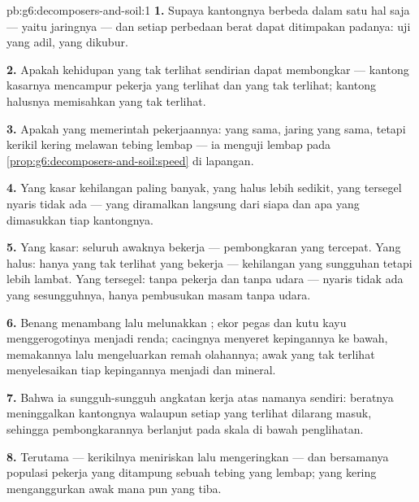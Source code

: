 \begin{solution}{pb:g6:decomposers-and-soil:1}
\textbf{1.} Supaya kantongnya berbeda dalam satu hal saja --- yaitu
jaringnya --- dan setiap perbedaan berat dapat ditimpakan padanya: uji
yang adil, yang dikubur.

\textbf{2.} Apakah kehidupan  yang tak terlihat sendirian dapat
membongkar  --- kantong kasarnya mencampur pekerja yang terlihat
dan yang tak terlihat; kantong halusnya memisahkan yang tak terlihat.

\textbf{3.} Apakah  yang memerintah pekerjaannya:  yang
sama, jaring yang sama, tetapi kerikil kering melawan tebing lembap
--- ia menguji  lembap pada
\cref{prop:g6:decomposers-and-soil:speed} di lapangan.

\textbf{4.} Yang kasar kehilangan paling banyak, yang halus lebih
sedikit, yang tersegel nyaris tidak ada --- yang diramalkan langsung
dari siapa dan apa yang dimasukkan tiap kantongnya.

\textbf{5.} Yang kasar: seluruh awaknya bekerja --- pembongkaran yang
tercepat. Yang halus: hanya yang tak terlihat yang bekerja ---
kehilangan yang sungguhan tetapi lebih lambat. Yang tersegel: tanpa
pekerja dan tanpa udara --- nyaris tidak ada  yang
sesungguhnya, hanya pembusukan masam tanpa udara.

\textbf{6.} Benang  menambang lalu melunakkan ; ekor
pegas dan kutu kayu menggerogotinya menjadi renda; cacingnya menyeret
kepingannya ke bawah, memakannya lalu mengeluarkan remah olahannya;
awak yang tak terlihat menyelesaikan tiap kepingannya menjadi 
dan mineral.

\textbf{7.} Bahwa ia sungguh-sungguh angkatan kerja  atas
namanya sendiri: beratnya meninggalkan kantongnya walaupun setiap
 yang terlihat dilarang masuk, sehingga pembongkarannya berlanjut
pada skala di bawah penglihatan.

\textbf{8.} Terutama  --- kerikilnya meniriskan lalu
mengeringkan --- dan bersamanya populasi pekerja yang ditampung sebuah
tebing yang lembap;  yang kering menganggurkan awak mana pun
yang tiba.


\end{solution}
